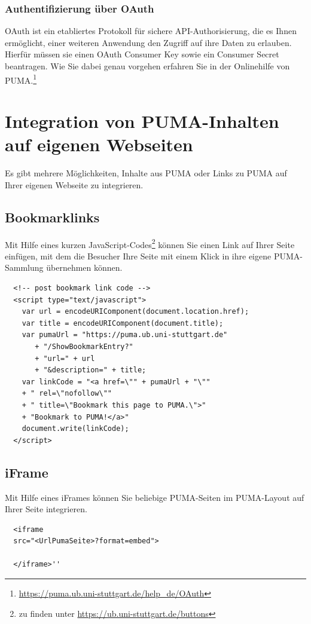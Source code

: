 \subsubsection*{Authentifizierung über OAuth}
\label{sss:oAuth}
OAuth ist ein etabliertes Protokoll für sichere API-Authorisierung, die es Ihnen ermöglicht, einer weiteren Anwendung den Zugriff auf ihre Daten zu erlauben. Hierfür müssen sie einen OAuth Consumer Key sowie ein Consumer Secret beantragen. Wie Sie dabei genau vorgehen erfahren Sie in der Onlinehilfe von PUMA.\footnote{\url{https://puma.ub.uni-stuttgart.de/help_de/OAuth}}



\section{Integration von PUMA-Inhalten auf eigenen Webseiten}
\label{sec:eigeneWebseiten}
Es gibt mehrere Möglichkeiten, Inhalte aus PUMA oder Links zu PUMA auf Ihrer eigenen Webseite zu integrieren.

\subsection{Bookmarklinks}
\label{subsec:bookmarklinks}
Mit Hilfe eines kurzen JavaScript-Codes\footnote{zu finden unter \url{https://ub.uni-stuttgart.de/buttons}} können Sie einen Link auf Ihrer Seite einfügen, mit dem die Besucher Ihre Seite mit einem Klick in ihre eigene PUMA-Sammlung übernehmen können.
\lstset{language=JavaScript}
\begin{lstlisting}
  <!-- post bookmark link code -->
  <script type="text/javascript">
    var url = encodeURIComponent(document.location.href);
    var title = encodeURIComponent(document.title);
    var pumaUrl = "https://puma.ub.uni-stuttgart.de"
       + "/ShowBookmarkEntry?"
       + "url=" + url
       + "&description=" + title;
    var linkCode = "<a href=\"" + pumaUrl + "\""
    + " rel=\"nofollow\""
    + " title=\"Bookmark this page to PUMA.\">"
    + "Bookmark to PUMA!</a>"
    document.write(linkCode);
  </script>
\end{lstlisting}

\subsection{iFrame}
\label{subsec:iFrame}
Mit Hilfe eines iFrames können Sie beliebige PUMA-Seiten im PUMA-Layout auf Ihrer Seite integrieren. 
\lstset{language=HTML}
\begin{lstlisting}
  <iframe
  src="<UrlPumaSeite>?format=embed">

  </iframe>''
\end{lstlisting}


